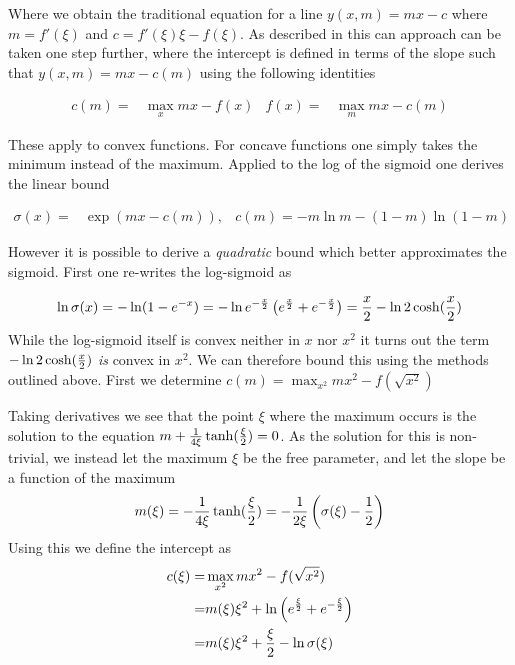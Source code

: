 Where we obtain the traditional equation for a line $y(x, m) = mx - c$ where $m = f'(\xi)$ and $c = f'(\xi)\xi - f(\xi)$. As described in \cite{Jordan1999} this can approach can be taken one step further, where the intercept is defined in terms of the slope such that $y(x, m) = mx - c(m)$ using the following identities

\begin{align}
c(m) = & \max _x mx - f(x) & f(x) = & \max _m mx - c(m)
\end{align}

These apply to convex functions. For concave functions one simply takes the minimum instead of the maximum. Applied to the log of the sigmoid one derives the linear bound

\begin{align}
\sigma(x) = & \exp(mx - c(m)), & c(m) = -m \ln m - (1-m) \ln (1-m)
\end{align}

However it is possible to derive a \emph{quadratic} bound which better approximates the sigmoid. First one re-writes the log-sigmoid as

\begin{equation}
\ln \sigma(x) = -\ln (1 - e^{-x}) = -\ln e^{-\frac{x}{2}} \left( e^{\frac{x}{2}} + e^{-\frac{x}{2}} \right) = \frac{x}{2} - \ln 2 \cosh (\frac{x}{2}) \label{eqn:jaakkola-start-point}
\end{equation}
 While the log-sigmoid itself is convex neither in $x$ nor $x^2$ it turns out the term $- \ln 2 \cosh (\frac{x}{2})$ \emph{is} convex in $x^2$. We can therefore bound this using the methods outlined above. First we determine $c(m) = \max_{x^2} mx^2 - f(\sqrt{x^2})$ 

Taking derivatives we see that the point $\xi$ where the maximum occurs is the solution to the equation $m + \frac{1}{4 \xi} \tanh (\frac{\xi}{2}) = 0$. As the solution for this is non-trivial, we instead let the maximum $\xi$ be the free parameter, and let the slope be a function of the maximum
\begin{align}
m(\xi) = -\frac{1}{4\xi} \tanh (\frac{\xi}{2}) = -\frac{1}{2\xi} \left(\sigma(\xi) - \frac{1}{2}\right)
\end{align}
Using this we define the intercept as
\begin{align}
\begin{split}
c(\xi) = & \max_{x^2} mx^2 - f(\sqrt{x^2}) \\
 = & m(\xi)\xi^2 + \ln \left(e^{\frac{\xi}{2}} + e^{-\frac{\xi}{2}} \right) \\
 = & m(\xi)\xi^2 + \frac{\xi}{2} - \ln \sigma (\xi)
\end{split}
\end{align}


